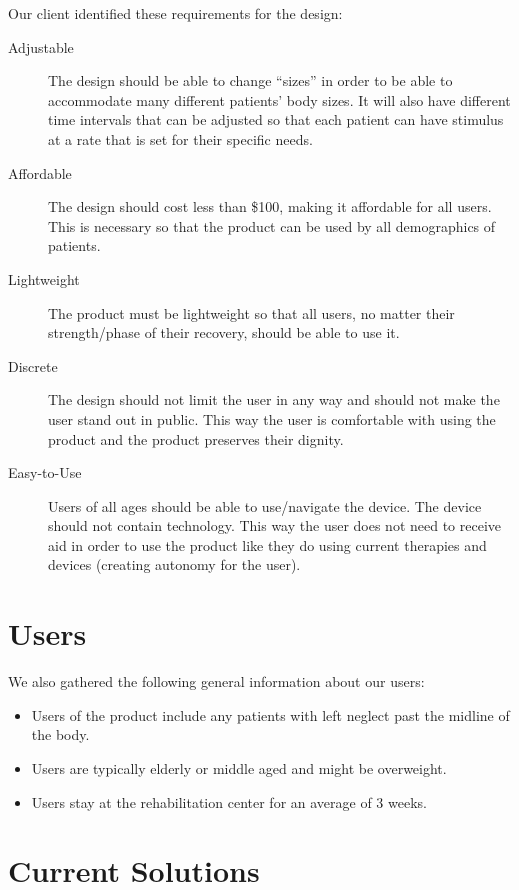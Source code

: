 Our client identified these requirements for the design:
\begin{description}
\item[Adjustable] The design should be able to change ``sizes'' in order to be
  able to accommodate many different patients' body sizes.  It will also have
  different time intervals that can be adjusted so that each patient can have
  stimulus at a rate that is set for their specific needs.
\item[Affordable] The design should cost less than \$100, making it affordable
  for all users. This is necessary so that the product can be used by all
  demographics of patients.
\item[Lightweight] The product must be lightweight so that all users, no matter
  their strength/phase of their recovery, should be able to use it.
\item[Discrete] The design should not limit the user in any way and should not
  make the user stand out in public. This way the user is comfortable with
  using the product and the product preserves their dignity.
\item[Easy-to-Use] Users of all ages should be able to use/navigate the
  device. The device should not contain technology. This way the user does not
  need to receive aid in order to use the product like they do using current
  therapies and devices (creating autonomy for the user).
\end{description}

\section{Users}

We also gathered the following general information about our users:
\begin{itemize}
\item Users of the product include any patients with left neglect past the
  midline of the body.
\item Users are typically elderly or middle aged and might be overweight.
\item Users stay at the rehabilitation center for an average of 3 weeks.
\end{itemize}

\section{Current Solutions}

